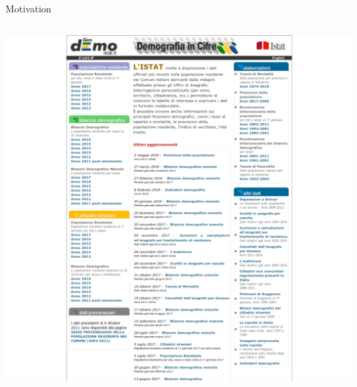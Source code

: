 \documentclass[12pt,aspectratio=169]{beamer}
\begin{document}
\begin{frame}{Motivation}
{\begin{columns}
\begin{column}{0.4\textwidth}
                \includegraphics[height=0.8\textheight]{figures/demo_istat}
            \end{column}
        \end{columns}}
\end{frame}
\end{document}
